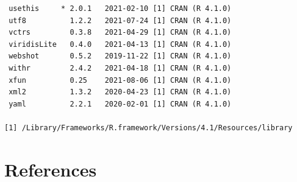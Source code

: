 \documentclass [11pt, proquest] {uwthesis}[2015/03/03]
\begin{document}
\begin{verbatim}
 usethis     * 2.0.1   2021-02-10 [1] CRAN (R 4.1.0)                       
 utf8          1.2.2   2021-07-24 [1] CRAN (R 4.1.0)                       
 vctrs         0.3.8   2021-04-29 [1] CRAN (R 4.1.0)                       
 viridisLite   0.4.0   2021-04-13 [1] CRAN (R 4.1.0)                       
 webshot       0.5.2   2019-11-22 [1] CRAN (R 4.1.0)                       
 withr         2.4.2   2021-04-18 [1] CRAN (R 4.1.0)                       
 xfun          0.25    2021-08-06 [1] CRAN (R 4.1.0)                       
 xml2          1.3.2   2020-04-23 [1] CRAN (R 4.1.0)                       
 yaml          2.2.1   2020-02-01 [1] CRAN (R 4.1.0)                       

[1] /Library/Frameworks/R.framework/Versions/4.1/Resources/library
\end{verbatim}
\backmatter

\hypertarget{references}{%
\chapter*{References}\label{references}}


\noindent

\setlength{\parindent}{-0.20in}
\setlength{\leftskip}{0.20in}
\setlength{\parskip}{8pt}
\end{document}
